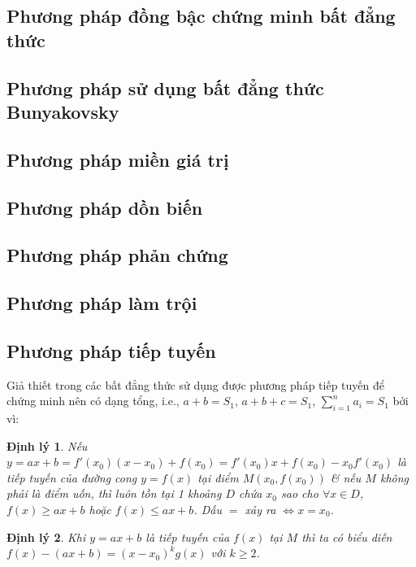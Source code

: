 \documentclass{article}
\newtheorem{dinhly}{Định lý}
\begin{document}
\subsection{Phương pháp đồng bậc chứng minh bất đẳng thức}

\subsection{Phương pháp sử dụng bất đẳng thức Bunyakovsky}

\subsection{Phương pháp miền giá trị}

\subsection{Phương pháp dồn biến}

\subsection{Phương pháp phản chứng}

\subsection{Phương pháp làm trội}

\subsection{Phương pháp tiếp tuyến}
Giả thiết trong các bất đẳng thức sử dụng được phương pháp tiếp tuyến để chứng minh nên có dạng tổng, i.e., $a + b = S_1$, $a + b + c = S_1$, $\sum_{i=1}^n a_i = S_1$ bởi vì:

\begin{dinhly}
	Nếu $y = ax + b = f'(x_0)(x - x_0) + f(x_0) = f'(x_0)x + f(x_0) - x_0f'(x_0)$ là tiếp tuyến của đường cong $y = f(x)$ tại điểm $M(x_0,f(x_0))$ \& nếu $M$ không phải là điểm uốn, thì luôn tồn tại 1 khoảng $D$ chứa $x_0$ sao cho $\forall x\in D$, $f(x)\ge ax + b$ hoặc $f(x)\le ax + b$. Dấu $=$ xảy ra $\Leftrightarrow x = x_0$.
\end{dinhly}

\begin{dinhly}
	Khi $y = ax + b$ là tiếp tuyến của $f(x)$ tại $M$ thì ta có biểu diễn $f(x) - (ax + b) = (x - x_0)^kg(x)$ với $k\ge2$.
\end{dinhly}
\end{document}
